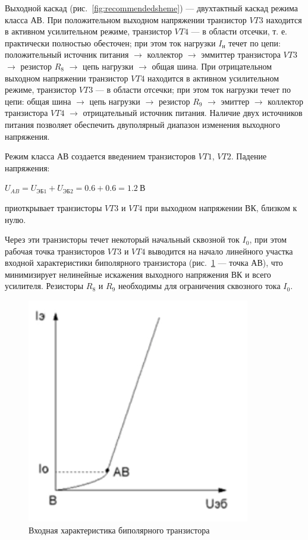 Выходной каскад (рис.~\ref{fig:recommendedsheme}) ---
двухтактный каскад режима класса $ АВ $.
При положительном выходном напряжении
транзистор $ VT3 $ находится в активном усилительном режиме,
транзистор $ VT4 $ --- в области отсечки,
т. е. практически полностью обесточен;
при этом ток нагрузки $ I_н $ течет по цепи:
положительный источник питания $ \rightarrow $
коллектор $ \rightarrow $
эммиттер транзистора $ VT3 $ $ \rightarrow $
резистор $ R_8 $ $ \rightarrow $
цепь нагрузки $ \rightarrow $
общая шина.
При отрицательном выходном напряжении
транзистор $ VT4 $ находится в активном усилительном режиме,
транзистор $ VT3 $ --- в области отсечки;
при этом ток нагрузки  течет по цепи:
общая шина $ \rightarrow $
цепь нагрузки $ \rightarrow $
резистор $ R_9 $ $ \rightarrow $
эмиттер $ \rightarrow $
коллектор транзистора $ VT4 $ $ \rightarrow $
отрицательный источник питания. 
Наличие двух источников питания позволяет обеспечить
двуполярный диапазон изменения выходного напряжения. 

Режим класса $ АВ $ создается 
введением транзисторов $ VT1 $, $ VT2 $.
Падение напряжения:

$ U_{AB} = U_{ЭБ1} + U_{ЭБ2} = 0.6 + 0.6 = 1.2~В $

приоткрывает транзисторы $ VT3 $ и $ VT4 $
при выходном напряжении ВК, близком к нулю.

Через эти транзисторы течет некоторый
начальный сквозной ток $ I_0 $, 
при этом рабочая точка транзисторов $ VT3 $ и $ VT4 $
выводится на начало линейного участка входной
характеристики биполярного транзистора 
(рис.~\ref{fig:transistor_char} --- точка АВ),
что минимизирует нелинейные искажения выходного напряжения
ВК и всего усилителя.
Резисторы $ R_8 $ и $ R_9 $ необходимы
для ограничения сквозного тока $ I_0 $.

\begin{figure}[H]
	\centering
	\includegraphics[width=0.7\linewidth]{photo/transistor_char}
	\caption{Входная характеристика биполярного транзистора}
	\label{fig:transistor_char}
\end{figure}

